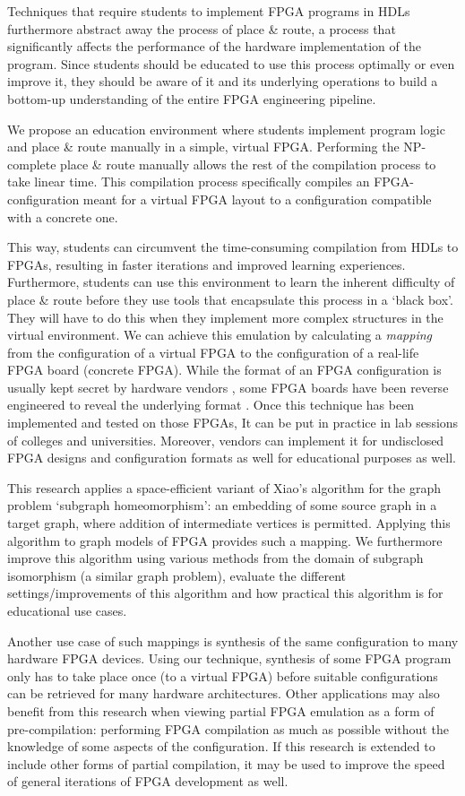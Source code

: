 Techniques that require students to implement FPGA programs in HDLs furthermore abstract away the process of place \& route, a process that significantly affects the performance of the hardware implementation of the program. Since students should be educated to use this process optimally or even improve it, they should be aware of it and its underlying operations to build a bottom-up understanding of the entire FPGA engineering pipeline.

We propose an education environment where students implement program logic and place \& route manually in a simple, virtual FPGA. Performing the NP-complete place \& route manually allows the rest of the compilation process to take linear time. This compilation process specifically compiles an FPGA-configuration meant for a virtual FPGA layout to a configuration compatible with a concrete one.

This way, students can circumvent the time-consuming compilation from HDLs to FPGAs, resulting in faster iterations and improved learning experiences. Furthermore, students can use this environment to learn the inherent difficulty of place \& route before they use tools that encapsulate this process in a `black box'. They will have to do this when they implement more complex structures in the virtual environment. We can achieve this emulation by calculating a \textit{mapping} from the configuration of a virtual FPGA to the configuration of a real-life FPGA board (concrete FPGA). While the format of an FPGA configuration is	 usually kept secret by hardware vendors \cite{Hauck:2007:RCT:1564780, 8653869, 6339165}, some FPGA boards have been reverse engineered to reveal the underlying format \cite{Yu2018}. Once this technique has been implemented and tested on those FPGAs, It can be put in practice in lab sessions of colleges and universities. Moreover, vendors can implement it for undisclosed FPGA designs and configuration formats as well for educational purposes as well.

This research applies a space-efficient variant of Xiao's algorithm \cite{todo} for the graph problem `subgraph homeomorphism': an embedding of some source graph in a target graph, where addition of intermediate vertices is permitted. Applying this algorithm to graph models of FPGA provides such a mapping. We furthermore improve this algorithm using various methods from the domain of subgraph isomorphism (a similar graph problem), evaluate the different settings/improvements of this algorithm and how practical this algorithm is for educational use cases. 

Another use case of such mappings is synthesis of the same configuration to many hardware FPGA devices. Using our technique, synthesis of some FPGA program only has to take place once (to a virtual FPGA) before suitable configurations can be retrieved for many hardware architectures. Other applications may also benefit from this research when viewing partial FPGA emulation as a form of pre-compilation: performing FPGA compilation as much as possible without the knowledge of some aspects of the configuration. If this research is extended to include other forms of partial compilation, it may be used to improve the speed of general iterations of FPGA development as well.